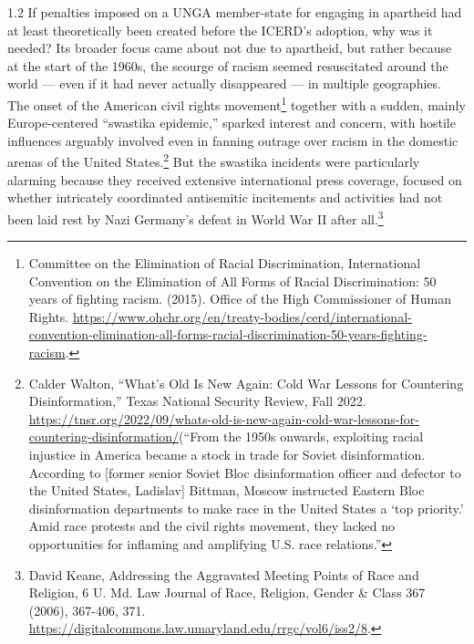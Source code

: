 \documentclass[../unravbook.tex]{subfiles}
\begin{document}
\begin{spacing}{1.2}
If penalties imposed on a UNGA member-state for engaging in apartheid had at least theoretically been created before the ICERD's adoption, why was it needed? Its broader focus came about not due to apartheid, but rather because at the start of the 1960s, the scourge of racism seemed resuscitated around the world --- even if it had never actually disappeared --- in multiple geographies. The onset of the American civil rights movement\footnote{Committee on the Elimination of Racial Discrimination, International Convention on the Elimination of All Forms of Racial Discrimination: 50 years of fighting racism. (2015). Office of the High Commissioner of Human Rights. \url{https://www.ohchr.org/en/treaty-bodies/cerd/international-convention-elimination-all-forms-racial-discrimination-50-years-fighting-racism}.} together with a sudden, mainly Europe-centered \enquote{swastika epidemic,} sparked interest and concern, with hostile influences arguably involved even in fanning outrage over racism in the domestic arenas of the United States.\footnote{Calder Walton, \enquote{What's Old Is New Again: Cold War Lessons for Countering Disinformation,} Texas National Security Review, Fall 2022. \url{https://tnsr.org/2022/09/whats-old-is-new-again-cold-war-lessons-for-countering-disinformation/}(\enquote{From the 1950s onwards, exploiting racial injustice in America became a stock in trade for Soviet disinformation. According to [former senior Soviet Bloc disinformation officer and defector to the United States, Ladislav] Bittman, Moscow instructed Eastern Bloc disinformation departments to make race in the United States a \enquote{top priority.} Amid race protests and the civil rights movement, they lacked no opportunities for inflaming and amplifying U.S. race relations.}} But the swastika incidents were particularly alarming because they received extensive international press coverage, focused on whether intricately coordinated antisemitic incitements and activities had not been laid rest by Nazi Germany's defeat in World War II after all.\footnote{David Keane, Addressing the Aggravated Meeting Points of Race and Religion, 6 U. Md. Law Journal of Race, Religion, Gender \& Class 367 (2006), 367-406, 371. \url{https://digitalcommons.law.umaryland.edu/rrgc/vol6/iss2/8}.} 


\end{spacing}
\end{document}

